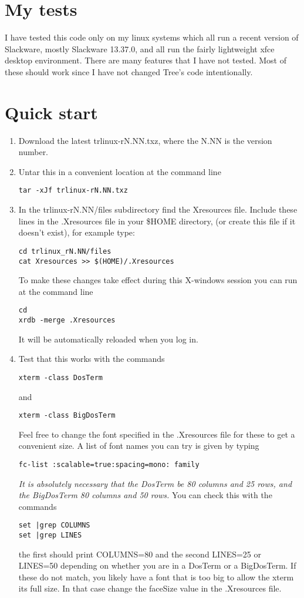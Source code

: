 \documentclass[12pt]{article}
\begin{document}
\section{My tests}
I have tested this code only on my linux systems which all run a recent
version of Slackware, mostly Slackware 13.37.0, and all run the fairly
lightweight xfce desktop environment. There are many features that I 
have not tested. Most of these should work since I have not changed Tree's
code intentionally.

\section{Quick start}
\begin{enumerate}
\item
Download the latest trlinux-rN.NN.txz, where the N.NN is the version number.
\item
Untar this in a convenient location at the command line
\begin{verbatim}
tar -xJf trlinux-rN.NN.txz
\end{verbatim}
\item
In the trlinux-rN.NN/files subdirectory find the Xresources file. Include
these lines in the .Xresources file in your \$HOME directory, (or
create this file if it doesn't exist), for example type:
\begin{verbatim}
cd trlinux_rN.NN/files
cat Xresources >> $(HOME)/.Xresources
\end{verbatim}
To make these changes take effect during this X-windows session
you can run at the command line
\begin{verbatim}
cd
xrdb -merge .Xresources
\end{verbatim}
It will be automatically reloaded when you log in.
\item
Test that this works with the commands
\begin{verbatim}
xterm -class DosTerm
\end{verbatim}
and
\begin{verbatim}
xterm -class BigDosTerm
\end{verbatim}
Feel free to change the font specified in the .Xresources file for these
to get a convenient size. A list of font names you can try is given by typing
\begin{verbatim}
fc-list :scalable=true:spacing=mono: family
\end{verbatim}

{\em It is absolutely necessary that
the DosTerm be 80 columns and 25 rows,
and the BigDosTerm 80 columns and 50 rows. }
You can check this with the commands
\begin{verbatim}
set |grep COLUMNS
set |grep LINES
\end{verbatim}
the first should print COLUMNS=80 and the second LINES=25 or LINES=50 depending
on whether you are in a DosTerm or a BigDosTerm. If these do not
match, you likely have a font that is too big to allow the xterm its
full size. In that case change the faceSize value in the .Xresources file.


\end{enumerate}
\end{document}
